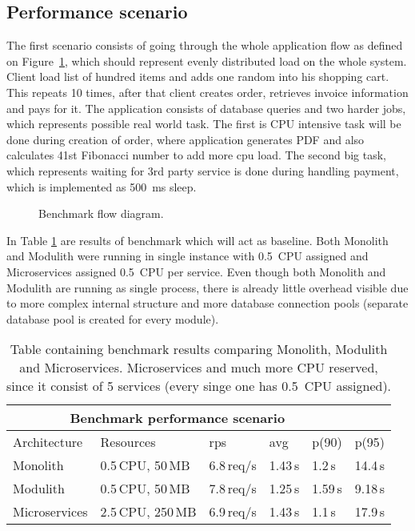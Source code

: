 \subsection{Performance scenario}
The first scenario consists of going through the whole application flow as defined on Figure~\ref{img:benchmark_flow}, which should represent evenly distributed load on the whole system. Client load list of hundred items and adds one random into his shopping cart. This repeats 10 times, after that client creates order, retrieves invoice information and pays for it. The application consists of database queries and two harder jobs, which represents possible real world task. The first is CPU intensive task will be done during creation of order, where application generates PDF and also calculates 41st Fibonacci number to add more cpu load. The second big task, which represents waiting for 3rd party service is done during handling payment, which is implemented as 500~ms sleep.

\begin{figure}
    \centering
    
    \caption{Benchmark flow diagram. \label{img:benchmark_flow}}
\end{figure}

In Table \ref{table:benchmark_baseline} are results of benchmark which will act as baseline. Both Monolith and Modulith were running in single instance with 0.5~CPU assigned and Microservices assigned 0.5~CPU per service. Even though both Monolith and Modulith are running as single process, there is already little overhead visible due to more complex internal structure and more database connection pools (separate database pool is created for every module).

\begin{table}
    \begin{tabular}{ |p{3cm}||p{3cm}|p{1.5cm}|p{1.5cm}|p{1.5cm}|p{1.5cm}| }
        \hline
        \multicolumn{5}{|c|}{Benchmark performance scenario}                           \\
        \hline
        Architecture  & Resources         & rps        & avg     & p(90)   & p(95)   \\
        \hline
        Monolith      & 0.5\,CPU, 50\,MB  & 6.8\,req/s & 1.43\,s & 1.2\,s  & 14.4\,s \\
        Modulith      & 0.5\,CPU, 50\,MB  & 7.8\,req/s & 1.25\,s & 1.59\,s & 9.18\,s \\
        Microservices & 2.5\,CPU, 250\,MB & 6.9\,req/s & 1.43\,s & 1.1\,s  & 17.9\,s \\
        \hline
    \end{tabular}
    \caption{Table containing benchmark results comparing Monolith, Modulith and Microservices. Microservices and much more CPU reserved, since it consist of 5 services (every singe one has 0.5~CPU assigned).\label{table:benchmark_baseline}}
\end{table}

